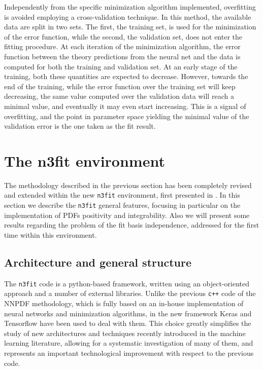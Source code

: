 %
Independently from the specific minimization algorithm implemented, overfitting is avoided
employing a cross-validation technique. In this method, the available data are split
in two sets. The first, the training set, is used for the minimization of the error function,
while the second, the validation set, does not enter the fitting procedure. At each iteration of
the minimization algorithm, the error function between the theory predictions from the neural
net and the data is computed for both the training and validation set. At an early stage of
the training, both these quantities are expected to decrease. However, towards the end of the
training, while the error function over the training set will keep decreasing, the same value
computed over the validation data will reach a minimal value, and eventually it may even start
increasing. This is a signal of overfitting, and the point in parameter space yielding the minimal
value of the validation error is the one taken as the fit result.  



\section{The n3fit environment}
\label{sec:n3fit}
The methodology described in the previous section has been completely revised and extended within the new
{\tt n3fit} environment, first presented in \cite{Carrazza:2019mzf}.
In this section we describe the {\tt n3fit} general features, focusing in particular
on the implementation of PDFs positivity and integrability. 
Also we will present some results regarding the problem of the fit basis independence, addressed for the first time
within this environment.

\subsection{Architecture and general structure}
The {\tt n3fit} code is a python-based framework, written using an object-oriented approach and
a number of external libraries. 
Unlike the previous {\tt c++} code of the NNPDF methodology, 
which is fully based on an in-house implementation of neural networks and minimization algorithms,
in the new framework Keras and Tensorflow have been used to deal with them.
This choice greatly simplifies the study of new architectures and techniques recently introduced
in the machine learning literature, allowing for a systematic investigation of many of them, 
and represents an important technological improvement with respect 
to the previous code. 


